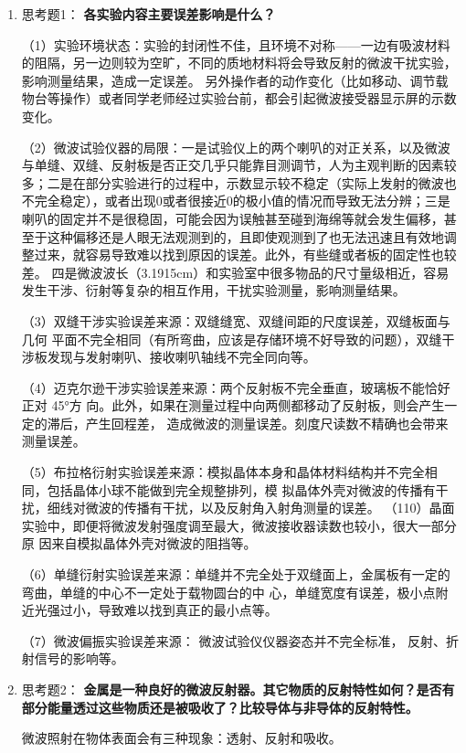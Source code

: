 \documentclass[11pt]{article}
\begin{document}
\begin{enumerate}
    \item 思考题1：  \textbf{各实验内容主要误差影响是什么？}

（1）实验环境状态：实验的封闭性不佳，且环境不对称——一边有吸波材料的阻隔，另一边则较为空旷，不同的质地材料将会导致反射的微波干扰实验，影响测量结果，造成一定误差。
另外操作者的动作变化（比如移动、调节载物台等操作）或者同学老师经过实验台前，都会引起微波接受器显示屏的示数变化。

（2）微波试验仪器的局限：一是试验仪上的两个喇叭的对正关系，以及微波与单缝、双缝、反射板是否正交几乎只能靠目测调节，人为主观判断的因素较多；二是在部分实验进行的过程中，示数显示较不稳定（实际上发射的微波也不完全稳定），或者出现0或者很接近0的极小值的情况而导致无法分辨；三是
喇叭的固定并不是很稳固，可能会因为误触甚至碰到海绵等就会发生偏移，甚至于这种偏移还是人眼无法观测到的，且即使观测到了也无法迅速且有效地调整过来，就容易导致难以找到原因的误差。此外，有些缝或者板的固定性也较差。
四是微波波长（3.1915cm）和实验室中很多物品的尺寸量级相近，容易发生干涉、衍射等复杂的相互作用，干扰实验测量，影响测量结果。

（3）双缝干涉实验误差来源：双缝缝宽、双缝间距的尺度误差，双缝板面与几何
平面不完全相同（有所弯曲，应该是存储环境不好导致的问题），双缝干涉板发现与发射喇叭、接收喇叭轴线不完全同向等。

（4）迈克尔逊干涉实验误差来源：两个反射板不完全垂直，玻璃板不能恰好正对 45°方
向。此外，如果在测量过程中向两侧都移动了反射板，则会产生一定的滞后，产生回程差，
造成微波的测量误差。刻度尺读数不精确也会带来测量误差。

（5）布拉格衍射实验误差来源：模拟晶体本身和晶体材料结构并不完全相同，包括晶体小球不能做到完全规整排列，模
拟晶体外壳对微波的传播有干扰，细线对微波的传播有干扰，以及反射角入射角测量的误差。
（110）晶面实验中，即便将微波发射强度调至最大，微波接收器读数也较小，很大一部分原
因来自模拟晶体外壳对微波的阻挡等。

（6）单缝衍射实验误差来源：单缝并不完全处于双缝面上，金属板有一定的弯曲，单缝的中心不一定处于载物圆台的中
心，单缝宽度有误差，极小点附近光强过小，导致难以找到真正的最小点等。

（7）微波偏振实验误差来源：
微波试验仪仪器姿态并不完全标准，
反射、折射信号的影响等。

    \item 思考题2：  \textbf{金属是一种良好的微波反射器。其它物质的反射特性如何？是否有部分能量透过这些物质还是被吸收了？比较导体与非导体的反射特性。}

    微波照射在物体表面会有三种现象：透射、反射和吸收。


\end{enumerate}
\end{document}
